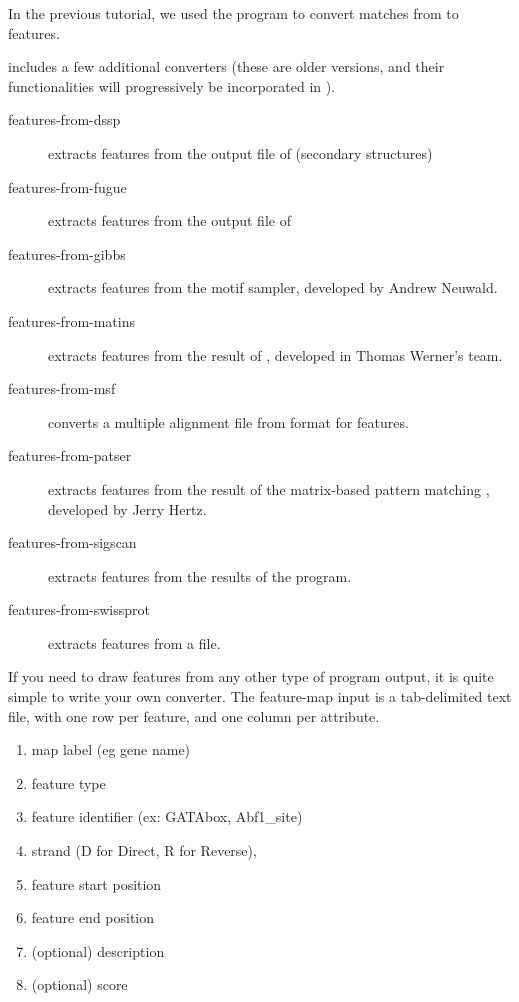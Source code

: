 In the previous tutorial, we used the program
 to convert matches from
 to features. 

\RSAT includes a few additional converters (these are older versions,
and their functionalities will progressively be incorporated in
).

\begin{description}

\item[features-from-dssp] extracts features from the output file of
 (secondary structures)

\item[features-from-fugue] extracts features from the output file of

\item[features-from-gibbs] extracts features from the  
motif sampler, developed by Andrew Neuwald. 

\item[features-from-matins] extracts features from the result of 
, developed in Thomas Werner's team. 

\item[features-from-msf] converts a multiple alignment file from 
format  for features. 

\item[features-from-patser] extracts features from the result of the 
matrix-based pattern matching , developed by Jerry Hertz. 

\item[features-from-sigscan] extracts features from the results of the
 program. 

\item[features-from-swissprot] extracts features from a  file. 

\end{description}


If you need to draw features from any other type of program 
output, it is quite simple to write your own converter. The feature-map 
input is a tab-delimited text file, with one row per feature, and 
one column per attribute. 

\begin{enumerate}
\item map label (eg gene name)
\item feature type
\item feature identifier (ex: GATAbox, Abf1\_site)
\item strand (D for Direct, R for Reverse),
\item feature start position
\item feature end position
\item (optional) description 
\item (optional) score
\end{enumerate}

